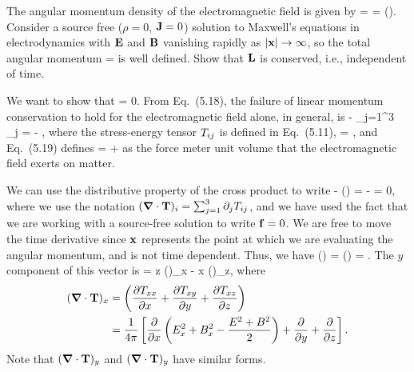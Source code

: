 \begin{statement}{}
	The angular momentum density of the electromagnetic field is given by
	\beq
		\vl = \vx \times \vcP
		=  \vx \times (\vE \times \vB).
	\eeq
	Consider a source free ($\rho = 0$, $\vb{J} = 0$) solution to Maxwell's equations in electrodynamics with $\vb{E}$ and $\vb{B}$ vanishing rapidly as $\abs{\vb{x}} \to \infty$, so the total angular momentum
	\beq
		\vL = \int \vl \dcx
	\eeq
	is well defined.  Show that $\vb{L}$ is conserved, i.e., independent of time.
\end{statement}

\begin{solution}
	We want to show that
	\beq
		 = 0.
	\eeq
	From Eq.~(5.18), the failure of linear momentum conservation to hold for the electromagnetic field alone, in general, is
	\beq
		 - \sum_{j=1}^3 \partial_j \Tij = - ,
	\eeq
	where the stress-energy tensor $T_{ij}$ is defined in Eq.~(5.11),
	\beq
		\Tij =  ,
	\eeq
	and Eq.~(5.19) defines
	\beq
		\vf = \rho \vE +  \vJ \times \vB
	\eeq
	as the force meter unit volume that the electromagnetic field exerts on matter.
	
	We can use the distributive property of the cross product to write
	\beq
		\vx \times {} - \vx \times (\grad \cdot \vT) = - \vx \times \vf = 0,
	\eeq
	where we use the notation $(\grad \cdot \vb{T})_i = \sum_{j=1}^3 \partial_j T_{ij}$, and we have used the fact that we are working with a source-free solution to write $\vb{f} = 0$.  We are free to move the time derivative since $\vb{x}$ represents the point at which we are evaluating the angular momentum, and is not time dependent.  Thus, we have
	\beqn \label{friend1}
		\vx \times (\grad \cdot \vT) =  (\vx \times \cP) = .
	\eeqn
	The $y$ component of this vector is
	\beq
		 = z (\grad \cdot \vT)_x - x (\grad \cdot \vT)_z,
	\eeq
	where
	\begin{align*}
		(\grad \cdot \vb{T})_x &= \left( \pdv{T_{xx}}{x} + \pdv{T_{xy}}{y} + \pdv{T_{xz}}{z} \right) \\
		&= \frac{1}{4\pi} \left[ \pdv{}{x} \left( E_x^2 + B_x^2 - \frac{E^2 + B^2}{2} \right) + \pdv{}{y} (E_x E_y + B_x B_y) + \pdv{}{z} (E_x E_z + B_x B_z) \right].
	\end{align*}
	Note that $(\grad \cdot \vb{T})_y$ and $(\grad \cdot \vb{T})_y$ have similar forms.
	

\end{solution}
